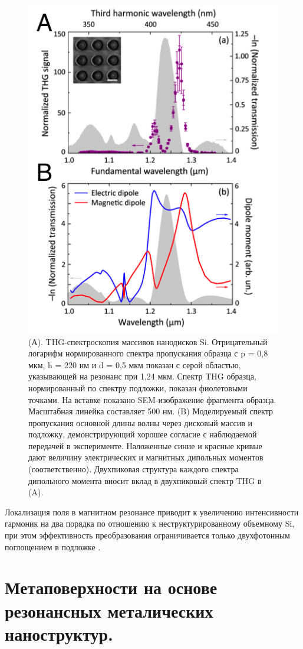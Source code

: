 \begin{figure}[h!]
    \centering
	\includegraphics[width=0.5\linewidth]{images/fig3.png}
	\caption{(А). THG-спектроскопия массивов нанодисков Si. Отрицательный логарифм нормированного спектра пропускания образца с p = 0,8 мкм, h = 220 нм и d = 0,5 мкм показан с серой областью, указывающей на резонанс при 1,24 мкм. Спектр THG образца, нормированный по спектру подложки, показан фиолетовыми точками. На вставке показано SEM-изображение фрагмента образца. Масштабная линейка составляет 500 нм. (B) Моделируемый спектр пропускания основной длины волны через дисковый массив и подложку, демонстрирующий хорошее согласие с наблюдаемой передачей в эксперименте. Наложенные синие и красные кривые дают величину электрических и магнитных дипольных моментов (соответственно). Двухпиковая структура каждого спектра дипольного момента вносит вклад в двухпиковый спектр THG в (A).}
	\label{nonliner:nanodisks}
\end{figure}
\hspace*{2mm}Локализация поля в магнитном резонансе приводит к увеличению интенсивности гармоник на два порядка по отношению к неструктурированному объемному Si, при этом эффективность преобразования ограничивается только двухфотонным поглощением в подложке \cite{shcherbakov2014enhanced}. 

\section{Метаповерхности на основе резонансных металических наноструктур.}

